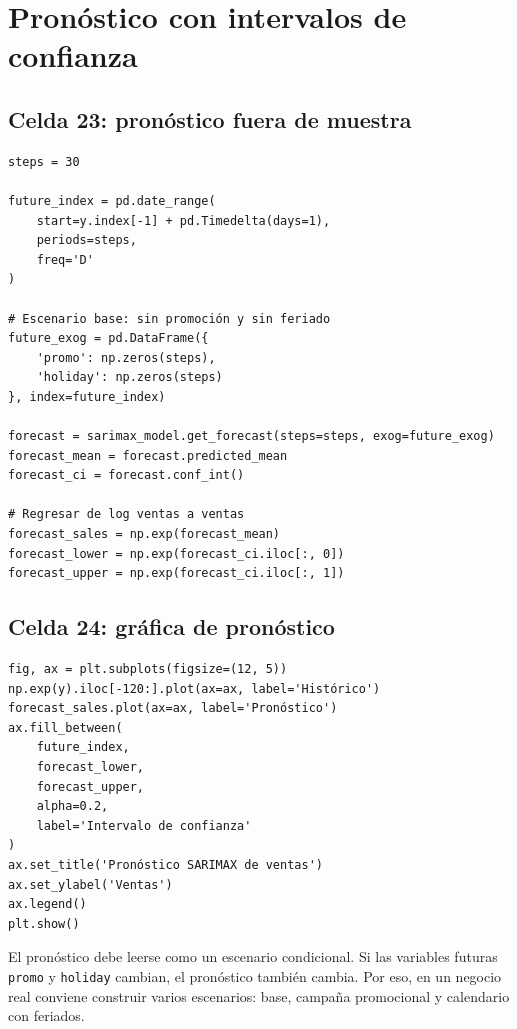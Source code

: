 \documentclass[11pt,letterpaper]{article}
\newcommand{\code}[1]{\texttt{#1}}
\begin{document}
\section{Pronóstico con intervalos de confianza}

\subsection{Celda 23: pronóstico fuera de muestra}

\begin{lstlisting}[style=pythoncolab]
steps = 30

future_index = pd.date_range(
    start=y.index[-1] + pd.Timedelta(days=1),
    periods=steps,
    freq='D'
)

# Escenario base: sin promoción y sin feriado
future_exog = pd.DataFrame({
    'promo': np.zeros(steps),
    'holiday': np.zeros(steps)
}, index=future_index)

forecast = sarimax_model.get_forecast(steps=steps, exog=future_exog)
forecast_mean = forecast.predicted_mean
forecast_ci = forecast.conf_int()

# Regresar de log ventas a ventas
forecast_sales = np.exp(forecast_mean)
forecast_lower = np.exp(forecast_ci.iloc[:, 0])
forecast_upper = np.exp(forecast_ci.iloc[:, 1])
\end{lstlisting}

\subsection{Celda 24: gráfica de pronóstico}

\begin{lstlisting}[style=pythoncolab]
fig, ax = plt.subplots(figsize=(12, 5))
np.exp(y).iloc[-120:].plot(ax=ax, label='Histórico')
forecast_sales.plot(ax=ax, label='Pronóstico')
ax.fill_between(
    future_index,
    forecast_lower,
    forecast_upper,
    alpha=0.2,
    label='Intervalo de confianza'
)
ax.set_title('Pronóstico SARIMAX de ventas')
ax.set_ylabel('Ventas')
ax.legend()
plt.show()
\end{lstlisting}

\begin{interpretacion}
El pronóstico debe leerse como un escenario condicional. Si las variables futuras \code{promo} y \code{holiday} cambian, el pronóstico también cambia. Por eso, en un negocio real conviene construir varios escenarios: base, campaña promocional y calendario con feriados.
\end{interpretacion}
\end{document}
